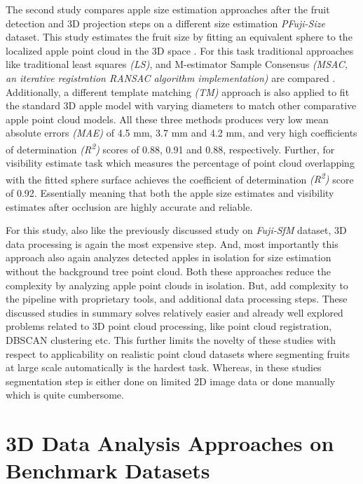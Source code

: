 \documentclass{article}
\begin{document}
The second study compares apple size estimation approaches after the fruit detection and 3D projection steps on a different size estimation \textit{PFuji-Size} dataset.
This study estimates the fruit size by fitting an equivalent sphere to the localized apple point cloud in the 3D space \cite{gene2021field}.
For this task traditional approaches like traditional least squares \textit{(LS)}, and M-estimator Sample Consensus \textit{(MSAC, an iterative registration RANSAC algorithm implementation)} are compared \cite{derpanis2010overview}.
Additionally, a different template matching \textit{(TM)} approach is also applied to fit the standard 3D apple model with varying diameters to match other comparative apple point cloud models.
All these three methods produces very low mean absolute errors \textit{(MAE)} of 4.5 mm, 3.7 mm and 4.2 mm, and very high coefficients of determination \textit{(R\textsuperscript{2})} scores of 0.88, 0.91 and 0.88, respectively.
Further, for visibility estimate task which measures the percentage of point cloud overlapping with the fitted sphere surface achieves the coefficient of determination \textit{(R\textsuperscript{2})} score of 0.92.
Essentially meaning that both the apple size estimates and visibility estimates after occlusion are highly accurate and reliable.


For this study, also like the previously discussed study on \textit{Fuji-SfM} dataset, 3D data processing is again the most expensive step.
And, most importantly this approach also again analyzes detected apples in isolation for size estimation without the background tree point cloud.
Both these approaches reduce the complexity by analyzing apple point clouds in isolation. But, add complexity to the pipeline with proprietary tools, and additional data processing steps.
These discussed studies in summary solves relatively easier and already well explored problems related to 3D point cloud processing, like point cloud registration, DBSCAN clustering etc.
This further limits the novelty of these studies with respect to applicability on realistic point cloud datasets where segmenting fruits at large scale automatically is the hardest task.
Whereas, in these studies segmentation step is either done on limited 2D image data or done manually which is quite cumbersome.


\section{3D Data Analysis Approaches on Benchmark Datasets}
\end{document}
